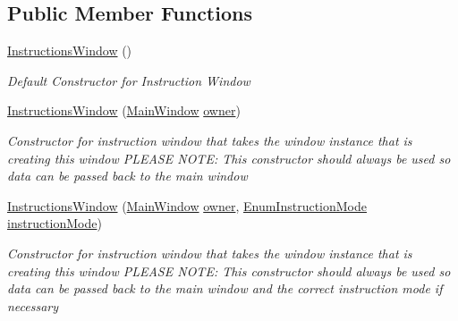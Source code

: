 \subsection*{Public Member Functions}
\begin{DoxyCompactItemize}
\item 
\hyperlink{class_c_p_u___o_s___simulator_1_1_instructions_window_aa482ef12f9c98458bedcc3c07d696879}{Instructions\+Window} ()
\begin{DoxyCompactList}\small\item\em Default Constructor for Instruction Window \end{DoxyCompactList}\item 
\hyperlink{class_c_p_u___o_s___simulator_1_1_instructions_window_a5ed238dc308dcc976400105a3973deb0}{Instructions\+Window} (\hyperlink{class_c_p_u___o_s___simulator_1_1_main_window}{Main\+Window} \hyperlink{class_c_p_u___o_s___simulator_1_1_instructions_window_a954c950c677c61a3b7ed7406b6dc7164}{owner})
\begin{DoxyCompactList}\small\item\em Constructor for instruction window that takes the window instance that is creating this window P\+L\+E\+A\+S\+E N\+O\+T\+E\+: This constructor should always be used so data can be passed back to the main window \end{DoxyCompactList}\item 
\hyperlink{class_c_p_u___o_s___simulator_1_1_instructions_window_afa6f0e58a20268fa56006a775c7959e4}{Instructions\+Window} (\hyperlink{class_c_p_u___o_s___simulator_1_1_main_window}{Main\+Window} \hyperlink{class_c_p_u___o_s___simulator_1_1_instructions_window_a954c950c677c61a3b7ed7406b6dc7164}{owner}, \hyperlink{namespace_c_p_u___o_s___simulator_adc17a5a5e004084f05dc8e4d3f70e31f}{Enum\+Instruction\+Mode} \hyperlink{class_c_p_u___o_s___simulator_1_1_instructions_window_aae7addf8e362e26e981b36b9940a53c0}{instruction\+Mode})
\begin{DoxyCompactList}\small\item\em Constructor for instruction window that takes the window instance that is creating this window P\+L\+E\+A\+S\+E N\+O\+T\+E\+: This constructor should always be used so data can be passed back to the main window and the correct instruction mode if necessary \end{DoxyCompactList}\end{DoxyCompactItemize}
